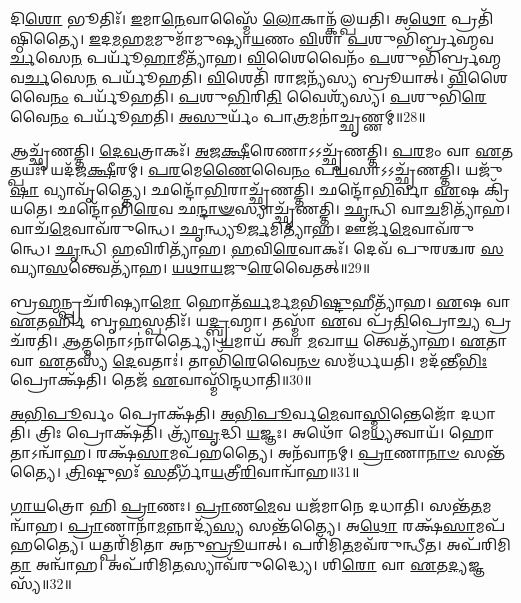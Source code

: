 𑌦𑌿\-\ul{𑌶𑍋} 𑌭𑍂𑌤𑌿𑌃᳴। 
\-\ul{𑌇}\-𑌮𑌾\-\ul{𑌨𑍇}\-𑌵𑌾𑌸𑍍𑌮𑍈᳴ \ul{𑌲𑍋}\-𑌕𑌾𑌨𑍍𑌕᳴𑌲𑍍𑌪𑌯𑌤𑌿। 
𑌅\-\ul{𑌥𑍋} 𑌪𑍍𑌰𑌤𑌿᳴𑌷𑍍𑌠𑌿𑌤𑍍𑌯𑍈। 
\-\ul{𑌇}\-𑌦\-\ul{𑌮}\-𑌹\-\ul{𑌮}\-𑌮𑍁𑌮𑌾᳴𑌮𑍁𑌷𑍍𑌯𑌾\-\ul{𑌯}\-𑌣𑌂  \ul{𑌵𑌿}\-𑌶𑌾 \ul{𑌪}\-𑌶𑍁𑌭𑌿᳴𑌰𑍍𑌬𑍍𑌰𑌹𑍍𑌮𑌵\-\ul{𑌰𑍍𑌚}\-𑌸𑍇\-\ul{𑌨} 𑌪𑌰𑍍𑌯𑍂᳴\-\ul{𑌹𑌾}\-𑌮𑍀𑌤𑍍𑌯𑌾᳴𑌹। 
\-\ul{𑌵𑌿}\-𑌶𑍈𑌵𑍈𑌨𑌂᳴ \ul{𑌪}\-𑌶𑍁𑌭𑌿᳴𑌰𑍍𑌬𑍍𑌰𑌹𑍍𑌮𑌵\-\ul{𑌰𑍍𑌚}\-𑌸𑍇\-\ul{𑌨} 𑌪𑌰𑍍𑌯𑍂᳴𑌹𑌤𑌿। 
\-\ul{𑌵𑌿}\-𑌶𑍇𑌤𑌿᳴ 𑌰𑌾\-\ul{𑌜}\-𑌨𑍍𑌯᳴𑌸𑍍𑌯 𑌬𑍍𑌰𑍂𑌯𑌾𑌤𑍍। 
\-\ul{𑌵𑌿}\-𑌶𑍈𑌵𑍈\-\ul{𑌨𑌂} 𑌪𑌰𑍍𑌯𑍂᳴𑌹𑌤𑌿। 
\-\ul{𑌪}\-𑌶𑍁\-\ul{𑌭𑌿}\-𑌰𑌿\-\ul{𑌤𑌿} 𑌵𑍈𑌶𑍍𑌯᳴𑌸𑍍𑌯। 
\-\ul{𑌪}\-𑌶𑍁𑌭𑌿᳴\-\ul{𑌰𑍇}\-𑌵𑍈\-\ul{𑌨𑌂} 𑌪𑌰𑍍𑌯𑍂᳴𑌹𑌤𑌿। 
\-\ul{𑌅}\-\-\ul{𑌸𑍁}\-𑌰𑍍𑌯𑌂᳴ 𑌪𑌾\-\ul{𑌤𑍍𑌰}\-𑌮𑌨𑌾॑𑌚𑍍𑌛𑍃𑌣𑍍𑌣𑌮𑍍॥28॥

𑌆𑌚𑍍𑌛𑍃᳴𑌣𑌤𑍍𑌤𑌿। 
\-\ul{𑌦𑍇}\-\-\ul{𑌵}\-𑌤𑍍𑌰𑌾𑌕𑌃᳴। 
\-\ul{𑌅}\-\-\ul{𑌜}\-\-\ul{𑌕𑍍𑌷𑍀}\-𑌰𑍇𑌣𑌾𑌽𑌽𑌚𑍍𑌛𑍃᳴𑌣𑌤𑍍𑌤𑌿। 
\-\ul{𑌪}\-\-\ul{𑌰}\-𑌮𑌂 𑌵𑌾 \ul{𑌏}\-𑌤𑌤𑍍𑌪𑌯𑌃᳴। 
𑌯𑌦᳴𑌜\-\ul{𑌕𑍍𑌷𑍀}\-𑌰𑌮𑍍। 
\-\ul{𑌪}\-\-\ul{𑌰}\-𑌮𑍇\-\ul{𑌣𑍈}\-𑌵𑍈\-\ul{𑌨𑌂} 𑌪\-\ul{𑌯}\-𑌸𑌾𑌽𑌽𑌚𑍍𑌛𑍃᳴𑌣𑌤𑍍𑌤𑌿। 
𑌯𑌜𑍁᳴\-\ul{𑌷𑌾} 𑌵𑍍𑌯𑌾𑌵𑍃᳴𑌤𑍍𑌤𑍍𑌯𑍈। 
𑌛𑌨𑍍𑌦𑍋᳴\-\ul{𑌭𑌿}\-𑌰𑌾𑌚𑍍𑌛𑍃᳴𑌣𑌤𑍍𑌤𑌿। 
𑌛𑌨𑍍𑌦𑍋᳴\-\ul{𑌭𑌿}\-𑌰𑍍𑌵𑌾 \ul{𑌏}\-𑌷 𑌕𑍍𑌰𑌿᳴𑌯𑌤𑍇। 
𑌛𑌨𑍍𑌦𑍋᳴𑌭𑌿\-\ul{𑌰𑍇}\-𑌵 𑌛\-\ul{𑌨𑍍𑌦𑌾}\-\-\ul{𑍟}\-𑌸𑍍𑌯𑌾𑌚𑍍𑌛𑍃᳴𑌣𑌤𑍍𑌤𑌿। 
\-\ul{𑌛𑍃}\-𑌨𑍍𑌧𑌿 𑌵𑌾\-\ul{𑌚}\-𑌮𑌿𑌤𑍍𑌯𑌾᳴𑌹। 
𑌵𑌾𑌚᳴\-\ul{𑌮𑍇}\-𑌵𑌾𑌵᳴𑌰𑍁𑌨𑍍𑌧𑍇। 
\-\ul{𑌛𑍃}\-𑌨𑍍𑌧𑍍𑌯𑍂\-\ul{𑌰𑍍𑌜}\-𑌮𑌿𑌤𑍍𑌯𑌾᳴𑌹। 
𑌊𑌰𑍍𑌜᳴\-\ul{𑌮𑍇}\-𑌵𑌾𑌵᳴𑌰𑍁𑌨𑍍𑌧𑍇। 
\-\ul{𑌛𑍃}\-𑌨𑍍𑌧𑌿 \ul{𑌹}\-𑌵𑌿𑌰𑌿𑌤𑍍𑌯𑌾᳴𑌹। 
\-\ul{𑌹}\-𑌵𑌿\-\ul{𑌰𑍇}\-𑌵𑌾𑌕𑌃᳴। 
𑌦𑍇𑌵᳴ 𑌪𑍁𑌰𑌶𑍍𑌚𑌰 \ul{𑌸}\-𑌘𑍍𑌯𑌾\-\ul{𑌸}\-𑌨𑍍𑌤𑍍𑌵𑍇𑌤𑍍𑌯𑌾᳴𑌹। 
\-\ul{𑌯}\-\-\ul{𑌥𑌾}\-\-\ul{𑌯}\-𑌜𑍁\-\ul{𑌰𑍇}\-𑌵𑍈𑌤𑌤𑍍॥29॥%
\anuvakamend[\-\ul{𑌸𑍍𑌯𑌾}\-𑌦𑍍𑌯𑌤𑍍𑌪𑍍𑌰᳴\-\ul{𑌵}\-𑌰𑍍𑌗𑍍𑌯᳴𑌶𑍍𑌛𑌨𑍍𑌦𑍋᳴𑌭𑌿𑌃 𑌕𑌰𑍋𑌤𑌿 \ul{𑌵𑍀}\-𑌰𑍍𑌯᳴𑌸𑌮𑍍𑌮𑌿\-\ul{𑌤𑌂} 𑌛𑌨𑍍𑌦𑌾𑍞᳴𑌸𑌿 \ul{𑌨𑌿}\-𑌷𑍍𑌪\-\ul{𑌤𑍍𑌪𑍃}\-𑌣𑍇𑌤𑍍𑌯𑌾᳴𑌹 𑌸𑍁\-\ul{𑌕𑍍𑌷𑌿}\-𑌤𑌿𑌰𑌨𑌾॑𑌚𑍍𑌛𑍃\-\ul{𑌣𑍍𑌣}\-𑌞𑍍𑌛\-\ul{𑌨𑍍𑌦𑌾}\-\-\ul{𑍟}\-𑌸𑍍𑌯𑌾\-𑌚𑍍𑌛𑍃᳴𑌣\-\ul{𑌤𑍍𑌤𑍍𑌯}\-𑌷𑍍𑌟𑍗 𑌚᳴]

𑌬𑍍𑌰\-\ul{𑌹𑍍𑌮}\-𑌨𑍍𑌪𑍍𑌰𑌚᳴𑌰𑌿𑌷𑍍𑌯𑌾\-\ul{𑌮𑍋} 𑌹𑍋𑌤᳴\-\ul{𑌰𑍍𑌘}\-𑌰𑍍𑌮\-\ul{𑌮}\-𑌭𑌿\-\ul{𑌷𑍍𑌟𑍁}\-𑌹𑍀𑌤𑍍𑌯𑌾᳴𑌹। 
\-\ul{𑌏}\-𑌷 𑌵𑌾 \ul{𑌏}\-𑌤𑌰𑍍\mbox{}\-\ul{𑌹𑌿} 𑌬𑍃\-\ul{𑌹}\-𑌸𑍍𑌪𑌤𑌿𑌃᳴। 
𑌯\-\ul{𑌦𑍍𑌬𑍍𑌰}\-𑌹𑍍𑌮𑌾। 
𑌤𑌸𑍍𑌮𑌾᳴ \ul{𑌏}\-𑌵 𑌪𑍍𑌰᳴\-\ul{𑌤𑌿}\-𑌪𑍍𑌰𑍋\-\ul{𑌚𑍍𑌯} 𑌪𑍍𑌰𑌚᳴𑌰𑌤𑌿। 
\-\ul{𑌆}\-𑌤𑍍𑌮𑌨𑍋𑌽𑌨𑌾॑𑌰𑍍𑌤𑍍𑌯𑍈। 
\-\ul{𑌯}\-𑌮𑌾𑌯᳴ 𑌤𑍍𑌵𑌾 \ul{𑌮}\-𑌖𑌾\-\ul{𑌯} 𑌤𑍍𑌵𑍇𑌤𑍍𑌯𑌾᳴𑌹। 
\-\ul{𑌏}\-𑌤𑌾 𑌵𑌾 \ul{𑌏}\-𑌤𑌸𑍍𑌯᳴ \ul{𑌦𑍇}\-𑌵𑌤𑌾𑌃॑। 
𑌤𑌾𑌭𑌿᳴\-\ul{𑌰𑍇}\-𑌵𑍈\-\ul{𑌨}\-\-\ul{𑍞} 𑌸𑌮᳴𑌰𑍍𑌧𑌯𑌤𑌿। 
𑌮𑌦᳴𑌨𑍍𑌤𑍀\-\ul{𑌭𑌿𑌃} 𑌪𑍍𑌰𑍋𑌕𑍍𑌷᳴𑌤𑌿। 
𑌤𑍇𑌜᳴ \ul{𑌏}\-𑌵𑌾𑌸𑍍𑌮𑌿᳴𑌨𑍍𑌦𑌧𑌾𑌤𑌿॥30॥

\-\ul{𑌅}\-\-\ul{𑌭𑌿}\-\-\ul{𑌪𑍂}\-𑌰𑍍𑌵𑌂 𑌪𑍍𑌰𑍋𑌕𑍍𑌷᳴𑌤𑌿। 
\-\ul{𑌅}\-\-\ul{𑌭𑌿}\-\-\ul{𑌪𑍂}\-𑌰𑍍𑌵\-\ul{𑌮𑍇}\-𑌵𑌾\-\ul{𑌸𑍍𑌮𑌿}\-𑌨𑍍𑌤𑍇𑌜𑍋᳴ 𑌦𑌧𑌾𑌤𑌿। 
𑌤𑍍𑌰𑌿𑌃 𑌪𑍍𑌰𑍋𑌕𑍍𑌷᳴𑌤𑌿। 
𑌤𑍍𑌰𑍍𑌯𑌾᳴\-\ul{𑌵𑍃}\-𑌦𑍍𑌧𑌿 \ul{𑌯}\-𑌜𑍍𑌞𑌃। 
𑌅𑌥𑍋᳴ 𑌮𑍇\-\ul{𑌧𑍍𑌯}\-𑌤𑍍𑌵𑌾𑌯᳴। 
𑌹𑍋𑌤𑌾𑌽𑌨𑍍𑌵𑌾᳴𑌹। 
𑌰𑌕𑍍𑌷᳴\-\ul{𑌸𑌾}\-𑌮𑌪᳴𑌹𑌤𑍍𑌯𑍈। 
𑌅𑌨᳴𑌵𑌾𑌨𑌮𑍍। 
\-\ul{𑌪𑍍𑌰𑌾}\-𑌣𑌾\-\ul{𑌨𑌾}\-\-\ul{𑍞} 𑌸𑌨𑍍𑌤᳴𑌤𑍍𑌯𑍈। 
\-\ul{𑌤𑍍𑌰𑌿}\-𑌷𑍍𑌟𑍁𑌭𑌃᳴ \ul{𑌸}\-𑌤𑍀𑌰𑍍𑌗𑌾᳴\-\ul{𑌯}\-𑌤𑍍𑌰𑍀\-\ul{𑌰𑌿}\-𑌵𑌾𑌨𑍍𑌵𑌾᳴𑌹॥31॥

\-\ul{𑌗𑌾}\-\-\ul{𑌯}\-𑌤𑍍𑌰𑍋 𑌹𑌿 \ul{𑌪𑍍𑌰𑌾}\-𑌣𑌃। 
\-\ul{𑌪𑍍𑌰𑌾}\-𑌣\-\ul{𑌮𑍇}\-𑌵 𑌯𑌜᳴𑌮𑌾𑌨𑍇 𑌦𑌧𑌾𑌤𑌿। 
𑌸𑌨𑍍𑌤᳴\-\ul{𑌤}\-𑌮𑌨𑍍𑌵𑌾᳴𑌹। 
\-\ul{𑌪𑍍𑌰𑌾}\-𑌣𑌾𑌨𑌾᳴\-\ul{𑌮}\-𑌨𑍍𑌨𑌾𑌦𑍍𑌯᳴\-\ul{𑌸𑍍𑌯} 𑌸𑌨𑍍𑌤᳴𑌤𑍍𑌯𑍈। 
𑌅\-\ul{𑌥𑍋} 𑌰𑌕𑍍𑌷᳴\-\ul{𑌸𑌾}\-𑌮𑌪᳴𑌹𑌤𑍍𑌯𑍈। 
𑌯𑌤𑍍𑌪𑌰𑌿᳴𑌮𑌿𑌤𑌾 𑌅𑌨𑍁\-\ul{𑌬𑍍𑌰𑍂}\-𑌯𑌾𑌤𑍍। 
𑌪𑌰𑌿᳴𑌮𑌿\-\ul{𑌤}\-𑌮𑌵᳴𑌰𑍁𑌨𑍍𑌧𑍀𑌤। 
𑌅𑌪᳴𑌰𑌿𑌮𑌿\-\ul{𑌤𑌾} 𑌅𑌨𑍍𑌵𑌾᳴𑌹। 
𑌅𑌪᳴𑌰𑌿𑌮𑌿\-\ul{𑌤}\-𑌸𑍍𑌯𑌾𑌵᳴𑌰𑍁𑌦𑍍𑌧𑍍𑌯𑍈। 
𑌶𑌿\-\ul{𑌰𑍋} 𑌵𑌾 \ul{𑌏}\-𑌤\-\ul{𑌦𑍍𑌯}\-𑌜𑍍𑌞𑌸𑍍𑌯᳴॥32॥

